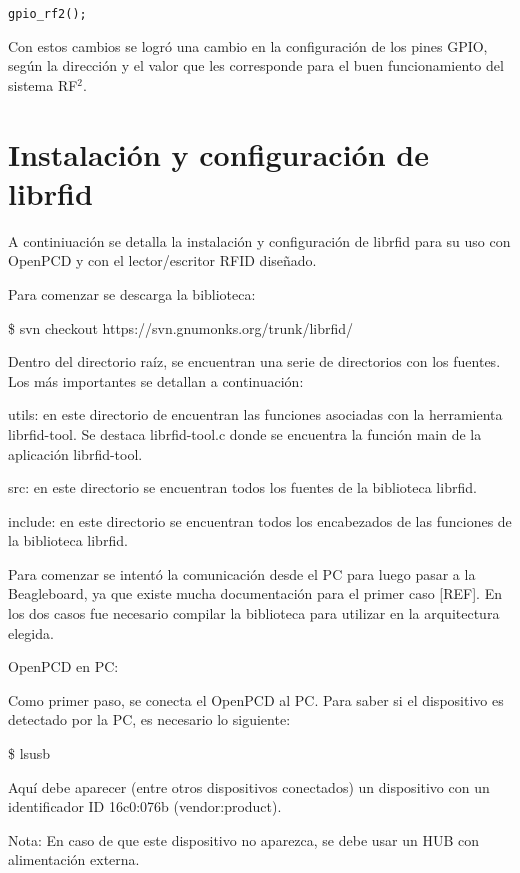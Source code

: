 \begin{verbatim}
gpio_rf2();
\end{verbatim}

Con estos cambios se logró una cambio en la configuración de los pines GPIO, según la dirección y el valor que les corresponde para el buen funcionamiento del sistema RF$^{2}$.


\section{Instalación y configuración de librfid}

A continiuación se detalla la instalación y configuración de librfid para su uso con OpenPCD y con el lector/escritor RFID diseñado.

Para comenzar se descarga la biblioteca:

\bigskip
\centerline{\$ svn checkout https://svn.gnumonks.org/trunk/librfid/}

\bigskip
Dentro del directorio raíz, se encuentran una serie de directorios con los fuentes. Los más importantes se detallan a continuación:

\bigskip
utils: en este directorio de encuentran las funciones asociadas con la herramienta librfid-tool. Se destaca librfid-tool.c donde se encuentra la función main de la aplicación librfid-tool.

\bigskip
src: en este directorio se encuentran todos los fuentes de la biblioteca librfid.

\bigskip
include: en este directorio se encuentran todos los encabezados de las funciones de la biblioteca librfid.


\bigskip
{}

\bigskip
Para comenzar se intentó la comunicación desde el PC para luego pasar a la Beagleboard, ya que existe mucha documentación para el primer caso [REF]. En los dos casos fue necesario compilar la biblioteca para utilizar en la arquitectura elegida.

\bigskip
OpenPCD en PC:

\bigskip
Como primer paso, se conecta el OpenPCD al PC. Para saber si el dispositivo es detectado por la PC, es necesario lo siguiente:

\bigskip
\centerline{\$ lsusb}

\bigskip
Aquí debe aparecer (entre otros dispositivos conectados) un dispositivo con un identificador ID 16c0:076b (vendor:product). 

\bigskip
Nota: En caso de que este dispositivo no aparezca, se debe usar un HUB con alimentación externa.

